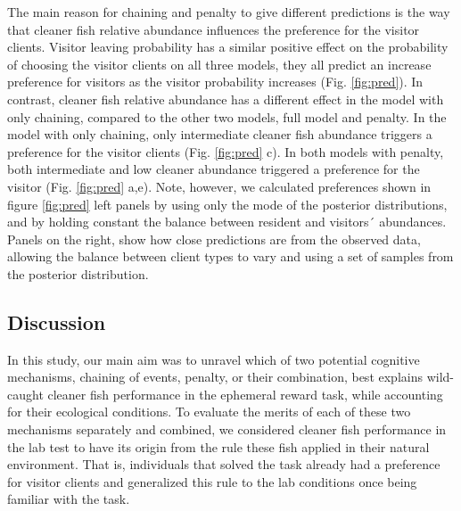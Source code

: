 \documentclass[
  12pt,
]{article}
\begin{document}
The main reason for chaining and penalty to give different predictions
is the way that cleaner fish relative abundance influences the
preference for the visitor clients. Visitor leaving probability has a
similar positive effect on the probability of choosing the visitor
clients on all three models, they all predict an increase preference for
visitors as the visitor probability increases (Fig. \ref{fig:pred}). In
contrast, cleaner fish relative abundance has a different effect in the
model with only chaining, compared to the other two models, full model
and penalty. In the model with only chaining, only intermediate cleaner
fish abundance triggers a preference for the visitor clients (Fig.
\ref{fig:pred} c). In both models with penalty, both intermediate and
low cleaner abundance triggered a preference for the visitor (Fig.
\ref{fig:pred} a,e). Note, however, we calculated preferences shown in
figure \ref{fig:pred} left panels by using only the mode of the
posterior distributions, and by holding constant the balance between
resident and visitors´ abundances. Panels on the right, show how close
predictions are from the observed data, allowing the balance between
client types to vary and using a set of samples from the posterior
distribution.

\hypertarget{discussion}{%
\subsection{Discussion}\label{discussion}}

In this study, our main aim was to unravel which of two potential
cognitive mechanisms, chaining of events, penalty, or their combination,
best explains wild-caught cleaner fish performance in the ephemeral
reward task, while accounting for their ecological conditions. To
evaluate the merits of each of these two mechanisms separately and
combined, we considered cleaner fish performance in the lab test to have
its origin from the rule these fish applied in their natural
environment. That is, individuals that solved the task already had a
preference for visitor clients and generalized this rule to the lab
conditions once being familiar with the task.
\end{document}
